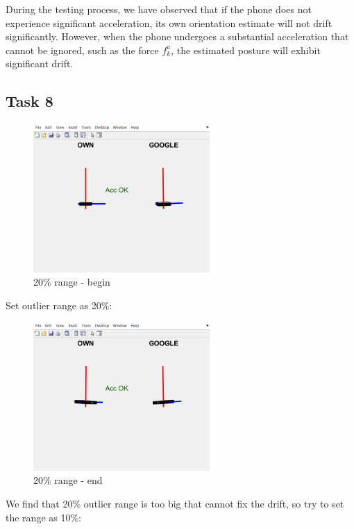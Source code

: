 During the testing process, we have observed that if the phone does not experience significant acceleration, its own orientation estimate will not drift significantly. However, when the phone undergoes a substantial acceleration that cannot be ignored, such as the force $ f_k^a $, the estimated posture will exhibit significant drift.


\subsection{Task 8}

\begin{figure}[H]
 \centering
 \includegraphics[width=0.6\textwidth]{images/beginwithoutlier.png}
 \caption{20\% range - begin}
 \label{label}
\end{figure}

Set outlier range as 20\%:

\begin{figure}[H]
 \centering
 \includegraphics[width=0.6\textwidth]{images/20range.png}
 \caption{20\% range - end}
 \label{label}
\end{figure}

We find that 20\% outlier range is too big that cannot fix the drift, so try to set the range as 10\%:

